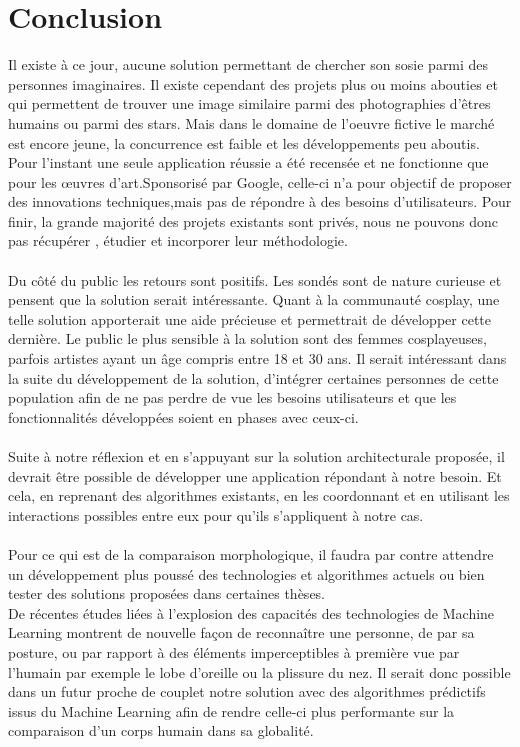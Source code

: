\documentclass[a4paper,12pt]{article}
\begin{document}
\newpage
{}
\section*{Conclusion}
Il existe à ce jour, aucune solution permettant de chercher son sosie parmi des personnes imaginaires. Il existe cependant des projets plus ou moins abouties et qui permettent de trouver une image similaire parmi des photographies d'êtres humains ou parmi des stars. Mais dans le domaine de l'oeuvre fictive le marché est encore jeune, la concurrence est faible et les développements peu aboutis. Pour l'instant une seule application réussie a été recensée et ne fonctionne que pour les œuvres d'art.Sponsorisé par Google, celle-ci n'a pour objectif de proposer des innovations techniques,mais pas de répondre à des besoins d'utilisateurs. Pour finir, la grande majorité des projets existants sont privés, nous ne pouvons donc pas récupérer , étudier et incorporer leur méthodologie. 
\\ \\ 
Du côté du public les retours sont positifs. Les sondés sont de nature curieuse et pensent que la solution serait intéressante. Quant à la communauté cosplay, une telle solution apporterait une aide précieuse et permettrait de développer cette dernière. Le public le plus sensible à la solution sont des femmes cosplayeuses, parfois artistes ayant un âge compris entre 18 et 30 ans. Il serait intéressant dans la suite du développement de la solution, d'intégrer certaines personnes de cette population afin de ne pas perdre de vue les besoins utilisateurs et que les fonctionnalités développées soient en phases avec ceux-ci.
\\ \\
Suite à notre réflexion et en s'appuyant sur la solution architecturale proposée, il devrait être possible de développer une application répondant à notre besoin. Et cela, en reprenant des algorithmes existants, en les coordonnant et en utilisant les interactions possibles entre eux pour qu'ils s'appliquent à notre cas. 
\\ \\ 
Pour ce qui est de la comparaison morphologique, il faudra par contre attendre un développement plus poussé des technologies et algorithmes actuels ou bien tester des solutions proposées dans certaines thèses.
\\
De récentes études liées à l'explosion des capacités des technologies de Machine Learning montrent de nouvelle façon de reconnaître une personne, de par sa posture, ou par rapport à des éléments imperceptibles à première vue par l'humain par exemple le lobe d'oreille ou la plissure du nez. Il serait donc possible dans un futur proche de couplet notre solution avec des algorithmes prédictifs issus du Machine Learning afin de rendre celle-ci plus performante sur la comparaison d'un corps humain dans sa globalité.
\newpage
\end{document}
